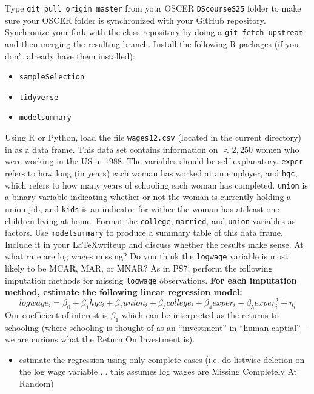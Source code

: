 \documentclass[12pt,english]{exam}
\begin{document}
\begin{questions}
\question Type \texttt{git pull origin master} from your OSCER \texttt{DScourseS25} folder to make sure your OSCER folder is synchronized with your GitHub repository. 
\question Synchronize your fork with the class repository by doing a \texttt{git fetch upstream} and then merging the resulting branch. 
\question Install the following R packages (if you don't already have them installed):
\begin{itemize}
    \item \texttt{sampleSelection}
    \item \texttt{tidyverse}
    \item \texttt{modelsummary}
\end{itemize}
\question Using R or Python, load the file \texttt{wages12.csv} (located in the current directory) in as a data frame. This data set contains information on $\approx 2,250$ women who were working in the US in 1988. The variables should be self-explanatory. \texttt{exper} refers to how long (in years) each woman has worked at an employer, and \texttt{hgc}, which refers to how many years of schooling each woman has completed. \texttt{union} is a binary variable indicating whether or not the woman is currently holding a union job, and \texttt{kids} is an indicator for wither the woman has at least one children living at home.
\question Format the \texttt{college}, \texttt{married}, and \texttt{union} variables as factors.
\question Use \texttt{modelsummary} to produce a summary table of this data frame. Include it in your \LaTeX writeup and discuss whether the results make sense.
At what rate are log wages missing? Do you think the \texttt{logwage} variable is most likely to be MCAR, MAR, or MNAR?
\question As in PS7, perform the following imputation methods for missing \texttt{logwage} observations. \textbf{For each imputation method, estimate the following linear regression model:}
\[
    logwage_{i} = \beta_{0} +  \beta_{1}hgc_{i} + \beta_{2}union_{i} + \beta_{3}college_{i} + \beta_{4}exper_{i} + \beta_{5}exper^{2}_{i} + \eta_{i}
\]
Our coefficient of interest is $\beta_{1}$ which can be interpreted as the returns to schooling (where schooling is thought of as an ``investment'' in ``human captial''---we are curious what the Return On Investment is).
\begin{itemize}
    \item estimate the regression using only complete cases (i.e. do listwise deletion on the log wage variable ... this assumes log wages are Missing Completely At Random)

\end{itemize}
\end{questions}
\end{document}
